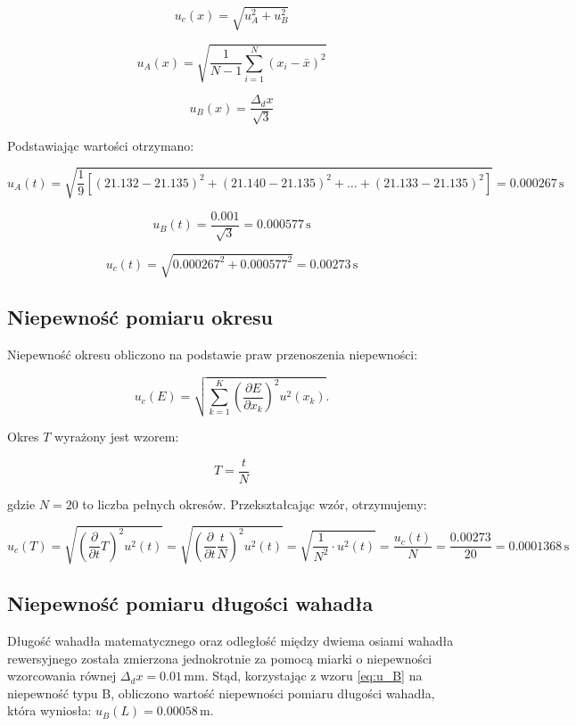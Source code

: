\documentclass[a4paper,12pt]{article}
\begin{document}
\begin{equation}
  \label{eq:u_c}
  u_c(x) = \sqrt{u_A^2 + u_B^2}
\end{equation}

\begin{equation}
  \label{eq:u_A}
  u_A(x) = \sqrt{\frac{1}{N-1} \sum_{i=1}^{N} (x_i - \bar{x})^2}
\end{equation}

\begin{equation}
  \label{eq:u_B}
  u_B(x) = \frac{\Delta_d x}{\sqrt{3}}
\end{equation}



Podstawiając wartości otrzymano:

$$
  u_A(t) = \sqrt{\frac{1}{9} [(21.132 - 21.135)^2 + (21.140 - 21.135)^2 + \ldots + (21.133 - 21.135)^2]} = 0.000267\,\text{s}
$$

$$
  u_B(t) = \frac{0.001}{\sqrt{3}} = 0.000577\,\text{s}
$$

$$
  u_c(t) = \sqrt{0.000267^2 + 0.000577^2} = 0.00273\,\text{s}
$$


\subsection{Niepewność pomiaru okresu}

Niepewność okresu obliczono na podstawie praw przenoszenia niepewności:

\begin{equation}
  \label{eq:niepewnosc_zlozona}
  u_c(E) = \sqrt{\sum_{k=1}^{K} \left( \frac{\partial E}{\partial x_k} \right)^2 u^2(x_k)}.
\end{equation}

Okres $T$ wyrażony jest wzorem:

\[
  T = \frac{t}{N}
\]

gdzie $N=20$ to liczba pełnych okresów. Przekształcając wzór, otrzymujemy:

\[
  u_c(T) = \sqrt{\left(\frac{\partial}{\partial t} T\right)^2 u^2(t)} = \sqrt{\left(\frac{\partial}{\partial t} \frac{t}{N}\right)^2 u^2(t)} = \sqrt{ \frac{1}{N^2} \cdot u^2(t)} = \frac{u_c(t)}{N} = \frac{0.00273}{20} = 0.0001368\,\text{s}
\]

\subsection{Niepewność pomiaru długości wahadła}

Długość wahadła matematycznego oraz odległość między dwiema osiami wahadła rewersyjnego została zmierzona jednokrotnie za pomocą miarki o niepewności wzorcowania równej $\Delta_d x = 0.01\,\text{mm}$. Stąd, korzystając z wzoru \ref{eq:u_B} na niepewność typu B, obliczono wartość niepewności pomiaru długości wahadła, która wyniosła: $u_B(L) = 0.00058\,\text{m}$.
\end{document}
